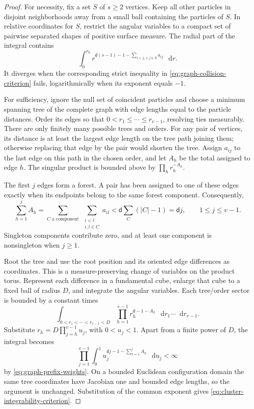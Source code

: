 \documentclass[11pt,reqno]{amsart}
\numberwithin{equation}{section}
\theoremstyle{plain}
\theoremstyle{definition}
\renewcommand{\d}{\mathsf d}
\newcommand{\dd}{\mathop{}\!\mathrm d}
\begin{document}
\begin{proof}
For necessity, fix a set $S$ of $s\geq2$ vertices. Keep all other particles in disjoint neighborhoods away from a small ball containing the particles of $S$. In relative coordinates for $S$, restrict the angular variables to a compact set of pairwise separated shapes of positive surface measure. The radial part of the integral contains
\begin{equation}
 \int_0^{r_0}r^{\d(s-1)-1-\sum_{i<j,\ i,j\in S}a_{ij}}\,\dd r.
 \label{eq:graph-necessary-radial}
\end{equation}
It diverges when the corresponding strict inequality in \eqref{eq:graph-collision-criterion} fails, logarithmically when its exponent equals $-1$.

For sufficiency, ignore the null set of coincident particles and choose a minimum spanning tree of the complete graph with edge lengths equal to the particle distances. Order its edges so that $0<r_1\leq\cdots\leq r_{v-1}$, resolving ties measurably. There are only finitely many possible trees and orders. For any pair of vertices, its distance is at least the largest edge length on the tree path joining them; otherwise replacing that edge by the pair would shorten the tree. Assign $a_{ij}$ to the last edge on this path in the chosen order, and let $A_h$ be the total assigned to edge $h$. The singular product is bounded above by $\prod_h r_h^{-A_h}$.

The first $j$ edges form a forest. A pair has been assigned to one of these edges exactly when its endpoints belong to the same forest component. Consequently,
\begin{equation}
 \sum_{h=1}^j A_h
 =\sum_{C\text{ a component}}\ \sum_{\substack{i<l\\i,l\in C}}a_{il}
 <\d\sum_C(|C|-1)=\d j,
 \qquad 1\leq j\leq v-1.
 \label{eq:graph-prefix-weights}
\end{equation}
Singleton components contribute zero, and at least one component is nonsingleton when $j\geq1$.

Root the tree and use the root position and its oriented edge differences as coordinates. This is a measure-preserving change of variables on the product torus. Represent each difference in a fundamental cube, enlarge that cube to a fixed ball of radius $D$, and integrate the angular variables. Each tree/order sector is bounded by a constant times
\begin{equation}
 \int_{0<r_1<\cdots<r_{v-1}<D}
 \prod_{h=1}^{v-1}r_h^{\d-1-A_h}\,\dd r_1\cdots\dd r_{v-1}.
 \label{eq:graph-tree-sector}
\end{equation}
Substitute $r_h=D\prod_{j=h}^{v-1}u_j$, with $0<u_j<1$. Apart from a finite power of $D$, the integral becomes
\begin{equation}
 \prod_{j=1}^{v-1}\int_0^1
 u_j^{\d j-1-\sum_{h=1}^j A_h}\,\dd u_j<\infty
 \label{eq:graph-sector-product}
\end{equation}
by \eqref{eq:graph-prefix-weights}. On a bounded Euclidean configuration domain the same tree coordinates have Jacobian one and bounded edge lengths, so the argument is unchanged. Substitution of the common exponent gives \eqref{eq:cluster-integrability-criterion}.
\end{proof}
\end{document}
